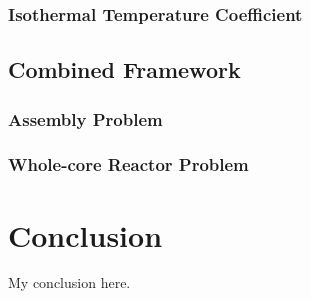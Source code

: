 \documentclass[11pt,a4paper,onecolumn,oneside]{report}
\begin{document}
\subsubsection{Isothermal Temperature Coefficient}

\subsection{Combined Framework}
\subsubsection{Assembly Problem}
\subsubsection{Whole-core Reactor Problem}


\newpage 
\section{Conclusion} 
My conclusion here.

\clearpage



\clearpage




\hbox{ }
\thispagestyle{empty}
\clearpage
\end{document}
